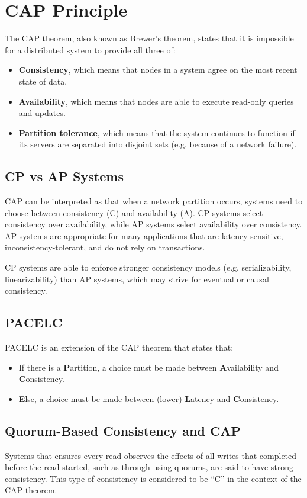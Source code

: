 \documentclass[12pt,titlepage]{article}
\let\stdsection\section
\renewcommand\section{\clearpage\stdsection}
\begin{document}
  \section{CAP Principle}
    The CAP theorem, also known as Brewer's theorem, states that it is impossible for a distributed system to provide all three of:
    \begin{itemize}
      \item \textbf{Consistency}, which means that nodes in a system agree on the most recent state of data.
      \item \textbf{Availability}, which means that nodes are able to execute read-only queries and updates.
      \item \textbf{Partition tolerance}, which means that the system continues to function if its servers are separated into disjoint sets (e.g. because of a network
        failure).
    \end{itemize}

    \subsection{CP vs AP Systems}
      CAP can be interpreted as that when a network partition occurs, systems need to choose between consistency (C) and availability (A). CP systems select
      consistency over availability, while AP systems select availability over consistency. AP systems are appropriate for many applications that are
      latency-sensitive, inconsistency-tolerant, and do not rely on transactions.

      CP systems are able to enforce stronger consistency models (e.g. serializability, linearizability) than AP systems, which may strive for eventual or
      causal consistency.

    \subsection{PACELC}
      PACELC is an extension of the CAP theorem that states that:
      \begin{itemize}
        \item If there is a \textbf{P}artition, a choice must be made between \textbf{A}vailability and \textbf{C}onsistency.
        \item \textbf{E}lse, a choice must be made between (lower) \textbf{L}atency and \textbf{C}onsistency.
      \end{itemize}

    \subsection{Quorum-Based Consistency and CAP}
      Systems that ensures every read observes the effects of all writes that completed before the read started, such as through using quorums, are said to
      have strong consistency. This type of consistency is considered to be ``C'' in the context of the CAP theorem.
\end{document}
